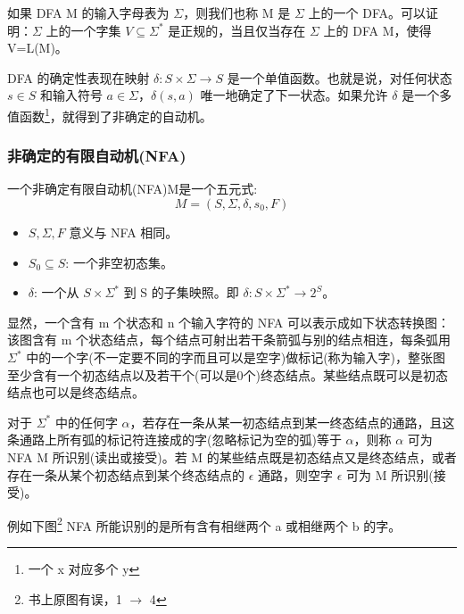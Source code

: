 如果 DFA M 的输入字母表为 $\Sigma$，则我们也称 M 是 $\Sigma$ 上的一个 DFA。可以证明：$\Sigma$ 上的一个字集 $V \subseteq \Sigma^*$ 是正规的，当且仅当存在 $\Sigma$ 上的 DFA M，使得 V=L(M)。

DFA 的确定性表现在映射 $\delta:S\times \Sigma \rightarrow S$ 是一个单值函数。也就是说，对任何状态 $s\in S$ 和输入符号 $a\in \Sigma$，$\delta(s,a)$ 唯一地确定了下一状态。如果允许 $\delta$ 是一个多值函数\footnote{一个 x 对应多个 y}，就得到了非确定的自动机。

\subsubsection{非确定的有限自动机(NFA)}

一个非确定有限自动机(NFA)M是一个五元式:
\[ M = (S,\Sigma,\delta,s_0,F) \]

\begin{itemize}
    \item $S,\Sigma,F$ 意义与 NFA 相同。
    \item $S_0 \subseteq S$: 一个非空初态集。
    \item $\delta$: 一个从 $S \times \Sigma^*$ 到 S 的子集映照。即 $\delta:S\times \Sigma^* \rightarrow 2^S$。
\end{itemize}

显然，一个含有 m 个状态和 n 个输入字符的 NFA 可以表示成如下状态转换图：该图含有 m 个状态结点，每个结点可射出若干条箭弧与别的结点相连，每条弧用 $\Sigma^*$ 中的一个字(不一定要不同的字而且可以是空字)做标记(称为输入字)，整张图至少含有一个初态结点以及若干个(可以是0个)终态结点。某些结点既可以是初态结点也可以是终态结点。

对于 $\Sigma^*$ 中的任何字 $\alpha$，若存在一条从某一初态结点到某一终态结点的通路，且这条通路上所有弧的标记符连接成的字(忽略标记为空的弧)等于 $\alpha$，则称 $\alpha$ 可为 NFA M 所识别(读出或接受)。若 M 的某些结点既是初态结点又是终态结点，或者存在一条从某个初态结点到某个终态结点的 $\epsilon$ 通路，则空字 $\epsilon$ 可为 M 所识别(接受)。

例如下图\footnote{书上原图有误，1 $\rightarrow$ 4} NFA 所能识别的是所有含有相继两个 a 或相继两个 b 的字。

